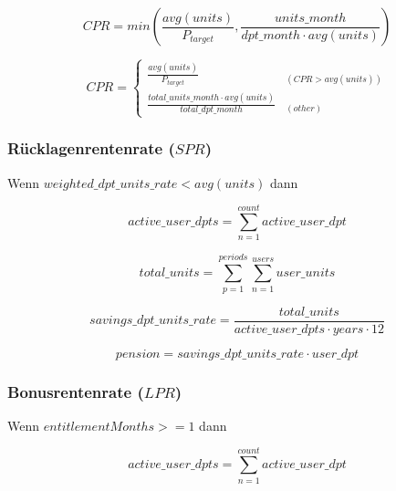 \begin{equation}
CPR = min(\frac{avg(units)}{P_{target}},\frac{units\_month} {dpt\_month \cdot avg(units)})
\end{equation}


\begin{equation}
CPR = \begin{cases} 
	\frac{avg(units)}{P_{target}} & _{(CPR > avg(units))} \\
	\frac{total\_units\_month  \cdot avg(units)} 
		{total\_dpt\_month} & _{(other)}
\end{cases}
\end{equation}





\subsubsection*{Rücklagenrentenrate ($SPR$)}

Wenn $weighted\_dpt\_units\_rate < avg(units)$ dann 

\begin{equation}
	active\_user\_dpts = 
	\sum_{n=1}^{count} active\_user\_dpt
\end{equation}

\begin{equation}
	total\_units = 	
	\sum_{p=1}^{periods} \sum_{n=1}^{users} user\_units	
\end{equation}

\begin{equation}
	savings\_dpt\_units\_rate = 	
	\frac{total\_units} 
	{active\_user\_dpts \cdot years \cdot 12}		
\end{equation}

\begin{equation}
	pension = savings\_dpt\_units\_rate \cdot user\_dpt
\end{equation}


\subsubsection*{Bonusrentenrate ($LPR$)}

Wenn $entitlementMonths >= 1$ dann 

\begin{equation*}
	active\_user\_dpts = 
	\sum_{n=1}^{count} active\_user\_dpt
\end{equation*}

